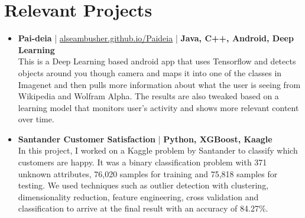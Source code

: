 \section{Relevant Projects}
\begin{itemize}
 \item \textbf{Pai-deia} | \href{http://alseambusher.github.io/Paideia}{alseambusher.github.io/Paideia} | \textbf{Java, C++, Android, Deep Learning}\\
 This is a Deep Learning based android app that uses Tensorflow and detects objects around you though camera and maps it into one of the classes in Imagenet and then pulls more information about what the user is seeing from Wikipedia and Wolfram Alpha. The results are also tweaked based on a learning model that monitors user's activity and shows more relevant content over time.

 \item \textbf{Santander Customer Satisfaction} | \textbf{Python, XGBoost, Kaagle}\\
In this project, I worked on a Kaggle problem by Santander to classify which customers are happy. It was a binary classification problem with 371 unknown attributes, 76,020 samples for training and 75,818 samples for testing. We used techniques such as outlier detection with clustering, dimensionality reduction, feature engineering, cross validation and classification to arrive at the final result with an accuracy of 84.27\%.



\end{itemize}
